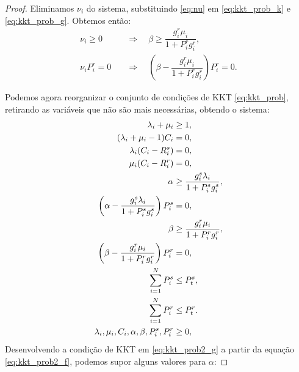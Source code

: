 \begin{proof}
    Eliminamos $\nu_i$ do sistema, substituindo \eqref{eq:nu} em \eqref{eq:kkt_prob_k} e \eqref{eq:kkt_prob_g}. Obtemos então:
    \begin{subequations}
            \begin{align}
                    \nu_i \geq 0 \quad &\Rightarrow \quad \beta \geq \dfrac{g_i^r\mu_i}{1 + P_i^rg_i^r}, \\
                    \nu_i P_i^r = 0 \quad &\Rightarrow \quad \left(\beta -\dfrac{g_i^r\mu_i}{1 + P_i^rg_i^r}\right) P_i^r = 0.
            \end{align}
    \end{subequations}

    Podemos agora reorganizar o conjunto de condições de \ac{KKT} \eqref{eq:kkt_prob}, retirando as variáveis que não são mais necessárias, obtendo o sistema: 
    \begin{subequations}\label{eq:kkt_prob2}
            \begin{align}
                    \allowdisplaybreaks[4]
                    \lambda_i + \mu_i &\geq 1, \label{eq:kkt_prob2_a}\\
                    (\lambda_i + \mu_i - 1) C_i &= 0, \label{eq:kkt_prob2_b}\\
                    \lambda_i(C_i - R_i^s) &= 0, \label{eq:kkt_prob2_c}\\
                    \mu_i(C_i - R_i^r) &= 0, \label{eq:kkt_prob2_d}\\
                    \alpha &\geq \dfrac{g_i^s\lambda_i}{1 + P_i^sg_i^s}, \label{eq:kkt_prob2_f}\\
                    \left(\alpha -\dfrac{g_i^s\lambda_i}{1 + P_i^sg_i^s}\right) P_i^s &= 0, \label{eq:kkt_prob2_g}\\
                    \beta &\geq \dfrac{g_i^r\mu_i}{1 + P_i^rg_i^r}, \label{eq:kkt_prob2_h}\\
                    \left(\beta -\dfrac{g_i^r\mu_i}{1 + P_i^rg_i^r}\right) P_i^r &= 0, \label{eq:kkt_prob2_i}\\
                    \sum_{i=1}^N P_i^s &\leq P_{t}^s, \label{eq:kkt_prob2_j}\\
                    \sum_{i=1}^N P_i^r &\leq P_{t}^r. \label{eq:kkt_prob2_k}\\
                    \lambda_i,\mu_i,C_i,\alpha,\beta,P_i^s,P_i^r &\geq 0, \label{eq:kkt_prob2_l}
            \end{align}
    \end{subequations}
    Desenvolvendo a condição de \ac{KKT} em \eqref{eq:kkt_prob2_g} a partir da equação \eqref{eq:kkt_prob2_f}, podemos supor alguns valores para $\alpha$:

\end{proof}
